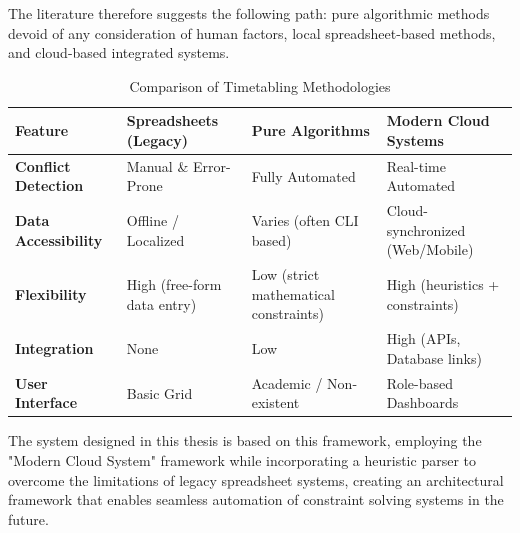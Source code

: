 The literature therefore suggests the following path: pure algorithmic methods devoid of any consideration of human factors, local spreadsheet-based methods, and cloud-based integrated systems.

\begin{table}[htbp]
\centering
\caption{Comparison of Timetabling Methodologies}
\label{tab:methodology_comparison}
\renewcommand{\arraystretch}{1.5}
\begin{tabularx}{\textwidth}{@{} l X X X @{}}
\toprule
\textbf{Feature} & \textbf{Spreadsheets (Legacy)} & \textbf{Pure Algorithms} & \textbf{Modern Cloud Systems} \\
\midrule
\textbf{Conflict Detection} & Manual \& Error-Prone & Fully Automated & Real-time Automated \\
\textbf{Data Accessibility} & Offline / Localized & Varies (often CLI based) & Cloud-synchronized (Web/Mobile) \\
\textbf{Flexibility} & High (free-form data entry) & Low (strict mathematical constraints) & High (heuristics + constraints) \\
\textbf{Integration} & None & Low & High (APIs, Database links) \\
\textbf{User Interface} & Basic Grid & Academic / Non-existent & Role-based Dashboards \\
\bottomrule
\end{tabularx}
\end{table}

The system designed in this thesis is based on this framework, employing the "Modern Cloud System" framework while incorporating a heuristic parser to overcome the limitations of legacy spreadsheet systems, creating an architectural framework that enables seamless automation of constraint solving systems in the future.